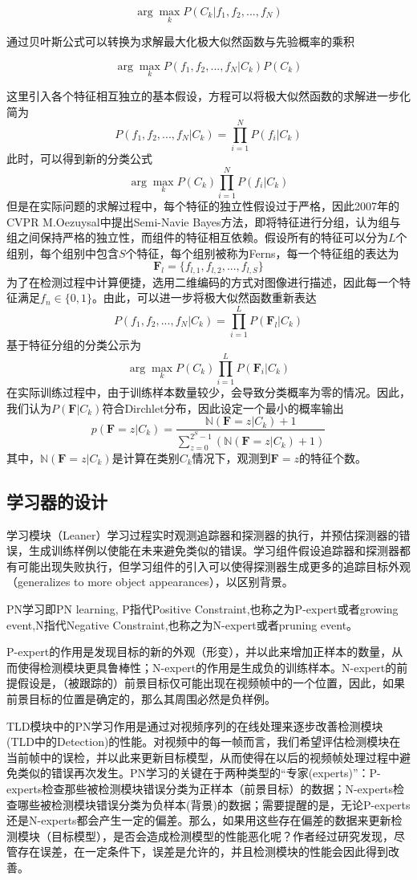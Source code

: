 $$\arg \max_{k}P(C_k|f_1, f_2, ..., f_N)$$

通过贝叶斯公式可以转换为求解最大化极大似然函数与先验概率的乘积

$$\arg \max_{k}P(f_1, f_2, ..., f_N|C_k)P(C_k)$$

这里引入各个特征相互独立的基本假设，方程可以将极大似然函数的求解进一步化简为
$$
P(f_1, f_2, ..., f_N|C_k)=\prod\limits_{i=1}^{N}P(f_i|C_k)
$$
此时，可以得到新的分类公式
$$
\arg\max_kP(C_k)\prod\limits_{i=1}^{N}P(f_i|C_k)
$$
但是在实际问题的求解过程中，每个特征的独立性假设过于严格，因此2007年的CVPR M.Oezuysal中提出Semi-Navie Bayes方法，即将特征进行分组，认为组与组之间保持严格的独立性，而组件的特征相互依赖。假设所有的特征可以分为$L$个组别，每个组别中包含$S$个特征，每个组别被称为Ferns，每一个特征组的表达为
$$
\mathbf{F}_l=\{f_{l,1}, f_{l,2},..., f_{l,S}\}
$$
为了在检测过程中计算便捷，选用二维编码的方式对图像进行描述，因此每一个特征满足$f_n\in\{{0,1}\}$。由此，可以进一步将极大似然函数重新表达
$$
P(f_1, f_2, ..., f_N|C_k)=\prod\limits_{i=1}^{L}P(\mathbf{F}_l|C_k)
$$
基于特征分组的分类公示为
$$
\arg\max_kP(C_k)\prod\limits_{i=1}^{L}P(\mathbf{F}_i|C_k)
$$
在实际训练过程中，由于训练样本数量较少，会导致分类概率为零的情况。因此，我们认为$P(\mathbf{F}|C_k)$符合Dirchlet分布，因此设定一个最小的概率输出
$$
p(\mathbf{F}=z|C_k)=\frac{\mathbb{N}(\mathbf{F}=z|C_k)+1}{\sum_{z=0}^{2^S-1}(\mathbb{N}(\mathbf{F}=z|C_k)+1)}
$$
其中，$\mathbb{N}(\mathbf{F}=z|C_k)$是计算在类别$C_k$情况下，观测到$\mathbf{F}=z$的特征个数。

\subsection{学习器的设计}
学习模块（Leaner）学习过程实时观测追踪器和探测器的执行，并预估探测器的错误，生成训练样例以使能在未来避免类似的错误。学习组件假设追踪器和探测器都有可能出现失败执行，但学习组件的引入可以使得探测器生成更多的追踪目标外观（generalizes to more object appearances），以区别背景。

PN学习即PN learning, P指代Positive Constraint,也称之为P-expert或者growing event,N指代Negative Constraint,也称之为N-expert或者pruning event。

P-expert的作用是发现目标的新的外观（形变），并以此来增加正样本的数量，从而使得检测模块更具鲁棒性；N-expert的作用是生成负的训练样本。N-expert的前提假设是，（被跟踪的）前景目标仅可能出现在视频帧中的一个位置，因此，如果前景目标的位置是确定的，那么其周围必然是负样例。

TLD模块中的PN学习作用是通过对视频序列的在线处理来逐步改善检测模块(TLD中的Detection)的性能。对视频中的每一帧而言，我们希望评估检测模块在当前帧中的误检，并以此来更新目标模型，从而使得在以后的视频帧处理过程中避免类似的错误再次发生。PN学习的关键在于两种类型的“专家(experts)”：P-experts检查那些被检测模块错误分类为正样本（前景目标）的数据；N-experts检查哪些被检测模块错误分类为负样本(背景)的数据；需要提醒的是，无论P-experts还是N-experts都会产生一定的偏差。那么，如果用这些存在偏差的数据来更新检测模块（目标模型），是否会造成检测模型的性能恶化呢？作者经过研究发现，尽管存在误差，在一定条件下，误差是允许的，并且检测模块的性能会因此得到改善。

